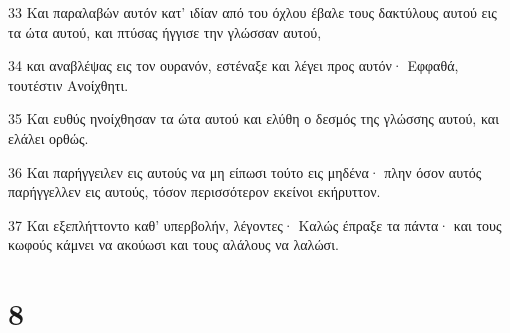 \par 33 Και παραλαβών αυτόν κατ' ιδίαν από του όχλου έβαλε τους δακτύλους αυτού εις τα ώτα αυτού, και πτύσας ήγγισε την γλώσσαν αυτού,
\par 34 και αναβλέψας εις τον ουρανόν, εστέναξε και λέγει προς αυτόν· Εφφαθά, τουτέστιν Ανοίχθητι.
\par 35 Και ευθύς ηνοίχθησαν τα ώτα αυτού και ελύθη ο δεσμός της γλώσσης αυτού, και ελάλει ορθώς.
\par 36 Και παρήγγειλεν εις αυτούς να μη είπωσι τούτο εις μηδένα· πλην όσον αυτός παρήγγελλεν εις αυτούς, τόσον περισσότερον εκείνοι εκήρυττον.
\par 37 Και εξεπλήττοντο καθ' υπερβολήν, λέγοντες· Καλώς έπραξε τα πάντα· και τους κωφούς κάμνει να ακούωσι και τους αλάλους να λαλώσι.

\chapter{8}

